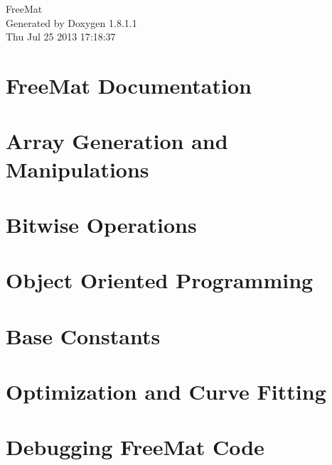 \documentclass{book}
\begin{document}
\hypersetup{pageanchor=false,citecolor=blue}
\begin{titlepage}
\vspace*{7cm}
\begin{center}
{\Large Free\-Mat }\\
\vspace*{1cm}
{\large Generated by Doxygen 1.8.1.1}\\
\vspace*{0.5cm}
{\small Thu Jul 25 2013 17:18:37}\\
\end{center}
\end{titlepage}
\clearemptydoublepage
{}
\tableofcontents
\clearemptydoublepage
{}
\hypersetup{pageanchor=true,citecolor=blue}
\chapter{Free\-Mat Documentation}
\label{index}\hypertarget{index}{}
\chapter{Array Generation and Manipulations}
\label{sec_array}
\hypertarget{sec_array}{}

\chapter{Bitwise Operations}
\label{sec_binary}
\hypertarget{sec_binary}{}

\chapter{Object Oriented Programming}
\label{sec_class}
\hypertarget{sec_class}{}

\chapter{Base Constants}
\label{sec_constants}
\hypertarget{sec_constants}{}

\chapter{Optimization and Curve Fitting}
\label{sec_curvefit}
\hypertarget{sec_curvefit}{}

\chapter{Debugging Free\-Mat Code}
\label{sec_debug}
\hypertarget{sec_debug}{}

\end{document}
